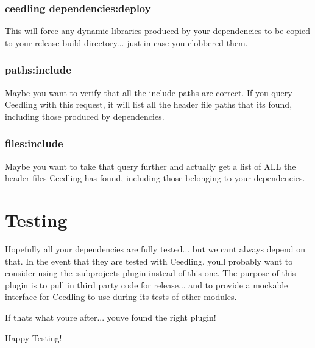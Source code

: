 \subsubsection*{{\ttfamily ceedling dependencies\+:deploy}}

This will force any dynamic libraries produced by your dependencies to be copied to your release build directory... just in case you clobbered them.

\subsubsection*{{\ttfamily paths\+:include}}

Maybe you want to verify that all the include paths are correct. If you query Ceedling with this request, it will list all the header file paths that it\textquotesingle{}s found, including those produced by dependencies.

\subsubsection*{{\ttfamily files\+:include}}

Maybe you want to take that query further and actually get a list of A\+LL the header files Ceedling has found, including those belonging to your dependencies.

\section*{Testing }

Hopefully all your dependencies are fully tested... but we can\textquotesingle{}t always depend on that. In the event that they are tested with Ceedling, you\textquotesingle{}ll probably want to consider using the {\ttfamily \+:subprojects} plugin instead of this one. The purpose of this plugin is to pull in third party code for release... and to provide a mockable interface for Ceedling to use during its tests of other modules.

If that\textquotesingle{}s what you\textquotesingle{}re after... you\textquotesingle{}ve found the right plugin!

Happy Testing! 